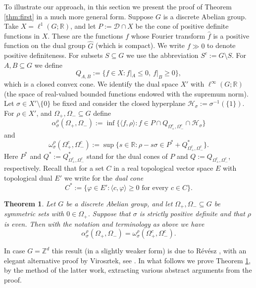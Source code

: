 \documentclass[[a4paper,english,12pt]{amsart}
\newcommand{\HH}{{\mathcal H}}
\theoremstyle{plain}
\newtheorem{theorem}{Theorem}[section]
\theoremstyle{remark}
\newcommand{\ft}[1]{\widehat{#1}}
\newcommand{\DD}{{\mathcal D}}
\newcommand{\ZZ}{\mathbb Z}
\newcommand{\RR}{\mathbb R}
\newcommand{\si}{\sigma}
\newcommand{\rh}{\rho}
\begin{document}
To illustrate our approach, in this section we present the proof of Theorem \ref{thm:first} in a much more general form.
Suppose $G$ is a discrete Abelian group. Take $X=\ell^1(G;\RR)$, and let $P:=\DD\cap X$ be the cone of positive definite functions in $X$. These are the functions $f$ whose Fourier transform $\widehat{f}$ is a positive function on the dual group $\ft{ G}$ (which is compact). We write $f \gg 0$ to denote positive definiteness. For subsets $S\subseteq G$ we use the abbreviation $S^c:=G\setminus S$.
For $A,B\subseteq G$ we define
\[
Q_{A,B}:=\{f\in X:f|_{A}\leq 0,\: f|_{B}\geq 0\},
\]
which is  a closed convex cone. We identify the dual space $X'$ with $\ell^\infty(G;\RR)$ (the space of real-valued bounded functions  endowed with the supremum norm).
Let $\si\in X' \setminus \{0\}$ be fixed and consider the closed hyperplane $\HH_\si:=\si^{-1}(\{1\})$. For $\rh\in X'$, and $\Omega_+,\Omega_-\subseteq G$ define
\[
 \alpha^\rh_\si(\Omega_+,\Omega_-) :=\inf\{\langle f,\rh\rangle:f\in P\cap Q_{\Omega_+^c,\Omega_-^c}\cap \HH_\si\}
 \]
and
\[
\omega^\rh_\si(\Omega_+^c,\Omega_-^c) :=\sup\{s\in \RR:\rh-s\si\in  P^*+Q_{\Omega_+^c,\Omega_-^c}^*\}.
\]
Here $P^*$ and $Q^*:=Q_{\Omega_+^c,\Omega_-^c}^*$ stand for the dual cones of $P$ and $Q:=Q_{\Omega_+^c,\Omega_-^c}$, respectively. Recall that for  a set $C$ in a real topological vector space $E$ with topological dual  $E'$ we write for the \emph{dual cone}
\[
C^*:=\{\varphi\in E':\langle c,\varphi\rangle\geq0\text{ for every $c\in C$}\}.
\]

\begin{theorem}\label{thm:revvir}
	Let $G$ be a discrete Abelian group, and let $\Omega_+,\Omega_-\subseteq G$ be symmetric sets with $0\in \Omega_+$. Suppose that  $\si$ is strictly positive definite and that $\rh$ is even. Then with the notation and terminology as above we have
\[
 \alpha^\rh_\si(\Omega_+,\Omega_-)=\omega^\rh_\si(\Omega_+^c,\Omega_-^c).
\]
\end{theorem}
In case $G=\ZZ^d$ this result (in a slightly weaker form) is due to R\'ev\'esz   \cite{R-Austral}, with an elegant alternative proof by Virosztek, see \cite{virosztek}.
In what follows we prove Theorem \ref{thm:revvir}, by the method of the latter work, extracting various abstract arguments from the proof.
\end{document}
